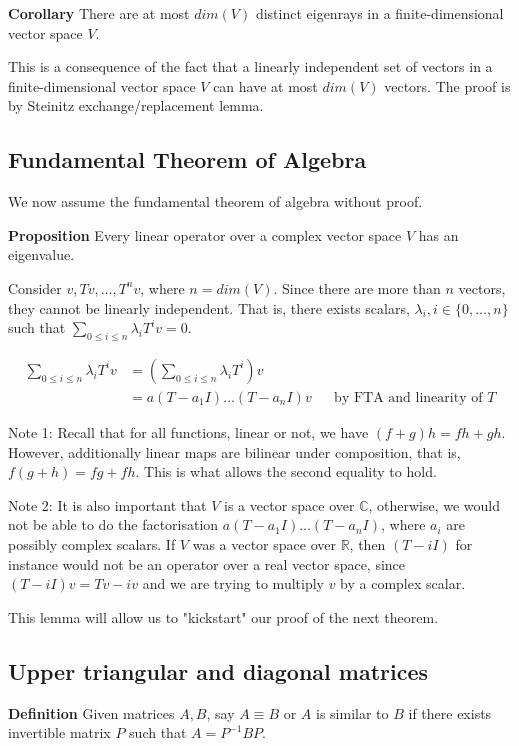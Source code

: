 \documentclass{article}
\begin{document}
\textbf{Corollary} There are at most $dim(V)$ distinct eigenrays in a finite-dimensional vector space $V$.

This is a consequence of the fact that a linearly independent set of vectors in a finite-dimensional vector space $V$ can have at most $dim(V)$ vectors.
The proof is by Steinitz exchange/replacement lemma.\\

\subsection{Fundamental Theorem of Algebra}
We now assume the fundamental theorem of algebra without proof.

\textbf{Proposition} Every linear operator over a complex vector space $V$ has an eigenvalue.

Consider $v, Tv, \dots, T^nv$, where $n=dim(V)$. Since there are more than $n$ vectors, they cannot be linearly independent. That is, there exists scalars, $\lambda_i, i\in \{0,\dots,n\}$ such that $\sum_{0\leq i\leq n}\lambda_i T^iv=0$.

\begin{align*}
	\sum_{0\leq i\leq n}\lambda_i T^iv&=(\sum_{0\leq i\leq n}\lambda_i T^i)v\\
	&=a(T-a_1I)\dots(T-a_nI)v &&\text{by FTA and linearity of $T$}
\end{align*}

Note 1: Recall that for all functions, linear or not, we have $(f+g)h=fh+gh$. However, additionally linear maps are bilinear under composition, that is, $f(g+h)=fg+fh$. This is what allows the second equality to hold.

Note 2: It is also important that $V$ is a vector space over $\mathbb{C}$, otherwise, we would not be able to do the factorisation $a(T-a_1I)\dots(T-a_nI)$, where $a_i$ are possibly complex scalars. If $V$ was a vector space over $\mathbb{R}$, then $(T-iI)$ for instance would not be an operator over a real vector space, since $(T-iI)v=Tv-iv$ and we are trying to multiply $v$ by a complex scalar.

This lemma will allow us to "kickstart" our proof of the next theorem.

\subsection{Upper triangular and diagonal matrices}
\textbf{Definition} Given matrices $A,B$, say $A\equiv B$ or $A$ is similar to $B$ if there exists invertible matrix $P$ such that $A=P^{-1}BP$.
\end{document}
